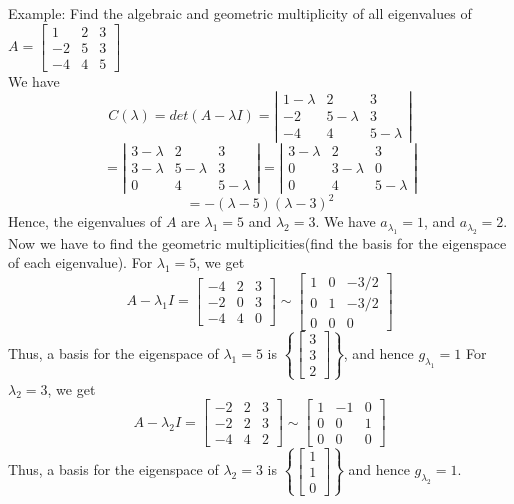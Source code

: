 \documentclass[10pt,letter]{article}
\begin{document}
Example: Find the algebraic and geometric multiplicity of all eigenvalues of $A=\begin{bmatrix}1&2&3\\-2&5&3\\-4&4&5\end{bmatrix}$\\ 
We have $$C(\lambda)=det(A-\lambda I)=\left|\begin{matrix}1-\lambda&2&3\\-2&5-\lambda&3\\-4&4&5-\lambda\end{matrix}\right|$$ $$=\left|\begin{matrix}3-\lambda&2&3\\3-\lambda&5-\lambda&3\\0&4&5-\lambda\end{matrix}\right|=\left|\begin{matrix}3-\lambda&2&3\\0&3-\lambda&0\\0&4&5-\lambda\end{matrix}\right|$$ $$=-(\lambda-5)(\lambda-3)^2$$ Hence, the eigenvalues of $A$ are $\lambda_1=5$ and $\lambda_2=3$. We have $a_{\lambda_1}=1$, and $a_{\lambda_2}=2$. Now we have to find the geometric multiplicities(find the basis for the eigenspace of each eigenvalue). For $\lambda_1=5$, we get $$A-\lambda_1I=\begin{bmatrix}-4&2&3\\-2&0&3\\-4&4&0\end{bmatrix}\sim\begin{bmatrix}1&0&-3/2\\0&1&-3/2\\0&0&0\end{bmatrix}$$ Thus, a basis for the eigenspace of $\lambda_1=5$ is $\left\{\begin{bmatrix}3\\3\\2\end{bmatrix}\right\}$, and hence $g_{\lambda_1}=1$ For $\lambda_2=3$, we get $$A-\lambda_2I=\begin{bmatrix}-2&2&3\\-2&2&3\\-4&4&2\end{bmatrix}\sim\begin{bmatrix}1&-1&0\\0&0&1\\0&0&0\end{bmatrix}$$ Thus, a basis for the eigenspace of $\lambda_2=3$ is $\left\{\begin{bmatrix}1\\1\\0\end{bmatrix}\right\}$ and hence $g_{\lambda_2}=1$. \\ 
\end{document}
